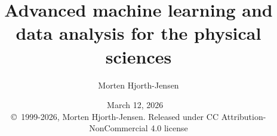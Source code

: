 \documentclass{beamer}
\begin{document}

\newcommand{\exercisesection}[1]{\subsection*{#1}}







\title{Advanced machine learning and data analysis for the physical sciences}


\author{Morten Hjorth-Jensen}

\date{March 12, 2026
\ \\ 
{\tiny \copyright\ 1999-2026, Morten Hjorth-Jensen. Released under CC Attribution-NonCommercial 4.0 license}
}

\begin{frame}
\titlepage
\end{frame}
\end{document}
